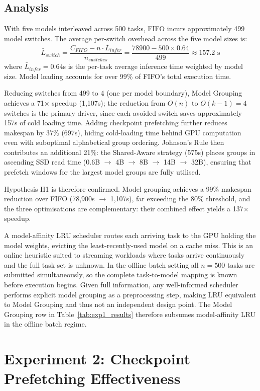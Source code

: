 \documentclass[logo,bsc,singlespacing,parskip,online]{infthesis}
\begin{document}
\subsection{Analysis}

With five models interleaved across 500 tasks, FIFO incurs approximately 499 model switches. The average per-switch overhead across the five model sizes is:
$$\bar{L}_{switch} = \frac{C_{FIFO} - n \cdot \bar{L}_{infer}}{n_{switches}} = \frac{78900 - 500 \times 0.64}{499} \approx 157.2 \text{ s}$$
where $\bar{L}_{infer} = 0.64$s is the per-task average inference time weighted by model size. Model loading accounts for over 99\% of FIFO's total execution time.

Reducing switches from 499 to 4 (one per model boundary), Model Grouping achieves a 71$\times$ speedup (1,107s); the reduction from $O(n)$ to $O(k{-}1) = 4$ switches is the primary driver, since each avoided switch saves approximately 157s of cold loading time. Adding checkpoint prefetching further reduces makespan by 37\% (697s), hiding cold-loading time behind GPU computation even with suboptimal alphabetical group ordering. Johnson's Rule then contributes an additional 21\%: the Shared-Aware strategy (575s) places groups in ascending SSD read time (0.6B $\to$ 4B $\to$ 8B $\to$ 14B $\to$ 32B), ensuring that prefetch windows for the largest model groups are fully utilised.

Hypothesis H1 is therefore confirmed. Model grouping achieves a 99\% makespan reduction over FIFO (78,900s $\to$ 1,107s), far exceeding the 80\% threshold, and the three optimisations are complementary: their combined effect yields a 137$\times$ speedup.

A model-affinity LRU scheduler routes each arriving task to the GPU holding the model weights, evicting the least-recently-used model on a cache miss. This is an online heuristic suited to streaming workloads where tasks arrive continuously and the full task set is unknown. In the offline batch setting all $n=500$ tasks are submitted simultaneously, so the complete task-to-model mapping is known before execution begins. Given full information, any well-informed scheduler performs explicit model grouping as a preprocessing step, making LRU equivalent to Model Grouping and thus not an independent design point. The Model Grouping row in Table~\ref{tab:exp1_results} therefore subsumes model-affinity LRU in the offline batch regime.

\section{Experiment 2: Checkpoint Prefetching Effectiveness}
\end{document}
